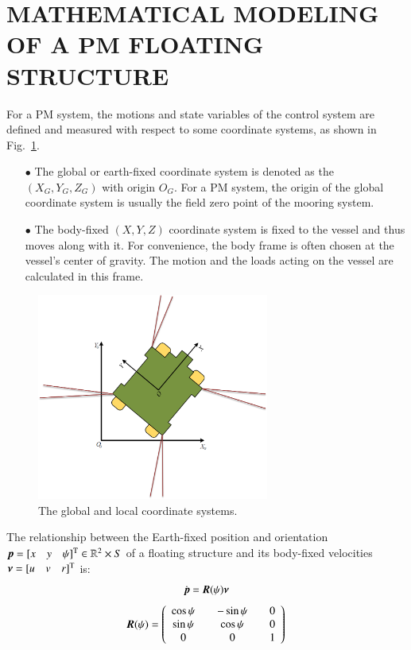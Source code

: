 \begin{sloppypar}
\section{MATHEMATICAL MODELING OF A PM FLOATING STRUCTURE}
\label{MATHEMATICAL MODELING}
For a PM system, the motions and state variables of the control system are defined and measured with respect to some coordinate systems, as shown in Fig.~\ref{fig:coordinate}.
\begin{itemize}
	\item[$\bullet$] The global or earth-fixed coordinate system is denoted as the $(X_G, Y_G, Z_G)$ with origin $O_G$. For a PM system, the origin of the global coordinate system is usually the field zero point of the mooring system.
	\item[$\bullet$] The body-fixed $(X, Y, Z)$ coordinate system is fixed to the vessel and thus moves along with it. For convenience, the body frame is often chosen at the vessel’s center of gravity. The motion and the loads acting on the vessel are calculated in this frame. 
\end{itemize}



\begin{figure}[htbp]
	\centering
	\includegraphics[width=3.0in]{Images/coordinate_new.png}
	\caption{The global and local coordinate systems.}
	\label{fig:coordinate}
\end{figure}


The relationship between the Earth-fixed position and orientation $\vec{p} = [x \quad y \quad \psi]^{\mathrm T} {\rm} \in \mathbb{R}^2 \times S$ of a floating structure and its body-fixed velocities $\vec{\nu} = [u \quad v \quad r]^{\mathrm T}{\rm}$ is:
\begin{equation} \label{Eq:etaequalrv}
{\dot{\vec{p}}} = \vec{R}(\psi)\vec{\nu}{\rm}
\end{equation}
\begin{equation}
  \vec{R}(\psi) =
  \left( \begin{array}{ccc}
  \cos\psi \quad & -\sin\psi \quad & 0 \\
  \sin\psi \quad & \cos\psi \quad & 0 \\
  0 \quad &  0 \quad & 1 \\
  \end{array}\right){\rm}
\end{equation}


\end{sloppypar}
